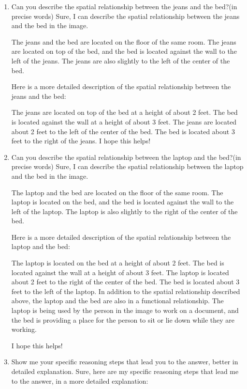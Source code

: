 \begin{enumerate}
    \item Can you describe the spatial relationship between the jeans and the bed?(in precise words)
    \subitem 
    Sure, I can describe the spatial relationship between the jeans and the bed in the image.
    
    The jeans and the bed are located on the floor of the same room. The jeans are located on top of the bed, and the bed is located against the wall to the left of the jeans. The jeans are also slightly to the left of the center of the bed.
    
    Here is a more detailed description of the spatial relationship between the jeans and the bed:
    
    The jeans are located on top of the bed at a height of about 2 feet.
    The bed is located against the wall at a height of about 3 feet.
    The jeans are located about 2 feet to the left of the center of the bed.
    The bed is located about 3 feet to the right of the jeans.
    I hope this helps!
    \item Can you describe the spatial relationship between the laptop and the bed?(in precise words)
    \subitem 
    Sure, I can describe the spatial relationship between the laptop and the bed in the image.
    
    The laptop and the bed are located on the floor of the same room. The laptop is located on the bed, and the bed is located against the wall to the left of the laptop. The laptop is also slightly to the right of the center of the bed.
    
    Here is a more detailed description of the spatial relationship between the laptop and the bed:
    
    The laptop is located on the bed at a height of about 2 feet.
    The bed is located against the wall at a height of about 3 feet.
    The laptop is located about 2 feet to the right of the center of the bed.
    The bed is located about 3 feet to the left of the laptop.
    In addition to the spatial relationship described above, the laptop and the bed are also in a functional relationship. The laptop is being used by the person in the image to work on a document, and the bed is providing a place for the person to sit or lie down while they are working.
    
    I hope this helps!
    \item Show me your specific reasoning steps that lead you to the answer, better in detailed explanation.
    \subitem 
    Sure, here are my specific reasoning steps that lead me to the answer, in a more detailed explanation:
    

\end{enumerate}
